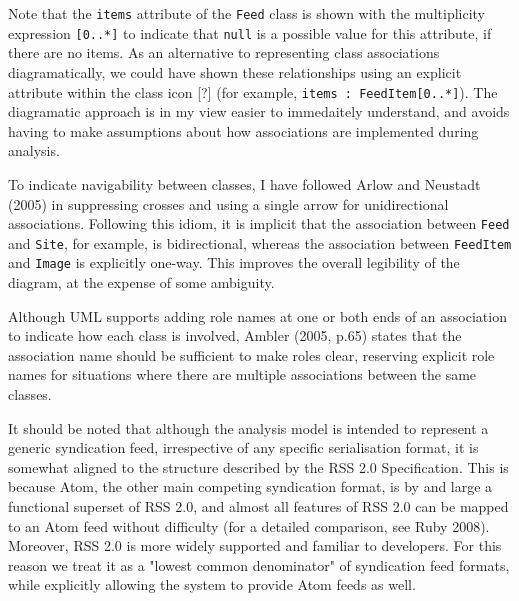 \documentclass{article}
\begin{document}
Note that the \texttt{items} attribute of the \texttt{Feed} class is shown with the multiplicity expression \texttt{[0..*]} to indicate that \texttt{null} is a possible value for this attribute, if there are no items. As an alternative to representing class associations diagramatically, we could have shown these relationships using an explicit attribute within the class icon [?] (for example, \texttt{items : FeedItem[0..*]}). The diagramatic approach is in my view easier to immedaitely understand, and avoids having to make assumptions about how associations are implemented during analysis.

To indicate navigability between classes, I have followed Arlow and Neustadt (2005) in suppressing crosses and using a single arrow for unidirectional associations. Following this idiom, it is implicit that the association between \texttt{Feed} and \texttt{Site}, for example, is bidirectional, whereas the association between \texttt{FeedItem} and \texttt{Image} is explicitly one-way. This improves the overall legibility of the diagram, at the expense of some ambiguity.

Although UML supports adding role names at one or both ends of an association to indicate how each class is involved, Ambler (2005, p.65) states that the association name should be sufficient to make roles clear, reserving explicit role names for situations where there are multiple associations between the same classes.

It should be noted that although the analysis model is intended to represent a generic syndication feed, irrespective of any specific serialisation format, it is somewhat aligned to the structure described by the RSS 2.0 Specification\cite{rss}. This is because Atom, the other main competing syndication format, is by and large a functional superset of RSS 2.0, and almost all features of RSS 2.0 can be mapped to an Atom feed without difficulty (for a detailed comparison, see Ruby 2008). Moreover, RSS 2.0 is more widely supported and familiar to developers. For this reason we treat it as a "lowest common denominator" of syndication feed formats, while explicitly allowing the system to provide Atom feeds as well.


\end{document}
